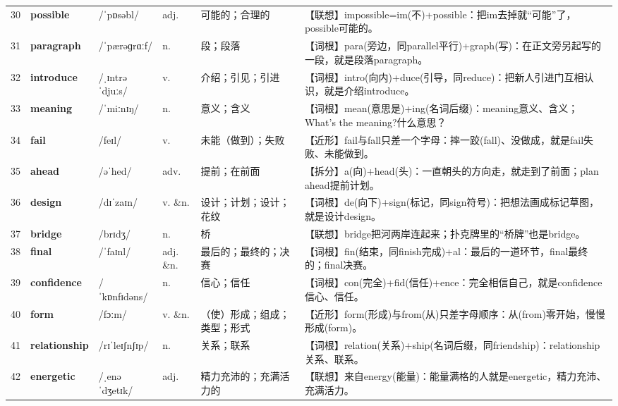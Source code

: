 \documentclass[UTF8,a4paper,11pt,oneside]{ctexbook}
\newcommand{\cellword}[1]{{\bfseries\textcolor{wordcol}{#1}}}
\newcommand{\cellipa}[1]{{\footnotesize\textcolor{ipacol}{#1}}}
\newcommand{\cellpos}[1]{\textcolor{poscol}{#1}}
\newcommand{\cellno}[1]{\textcolor{volcolor!75!black}{#1}}
\begin{document}
{\begin{longtable}{@{}C{0.045\textwidth}L{0.155\textwidth}L{0.175\textwidth}C{0.070\textwidth}L{0.180\textwidth}L{0.282\textwidth}@{}}
\cellno{30} & \cellword{possible} & \cellipa{/ˈpɒsəbl/} & \cellpos{adj.} & 可能的；合理的 & \textcolor{tagAssoc}{【联想】}impossible=im(不)+possible：把im去掉就“可能”了，possible可能的。 \\
 \cellno{31} & \cellword{paragraph} & \cellipa{/ˈpærəɡrɑːf/} & \cellpos{n.} & 段；段落 & \textcolor{tagRoot}{【词根】}para(旁边，同parallel平行)+graph(写)：在正文旁另起写的一段，就是段落paragraph。 \\
\cellno{32} & \cellword{introduce} & \cellipa{/ˌɪntrəˈdjuːs/} & \cellpos{v.} & 介绍；引见；引进 & \textcolor{tagRoot}{【词根】}intro(向内)+duce(引导，同reduce)：把新人引进门互相认识，就是介绍introduce。 \\
 \cellno{33} & \cellword{meaning} & \cellipa{/ˈmiːnɪŋ/} & \cellpos{n.} & 意义；含义 & \textcolor{tagRoot}{【词根】}mean(意思是)+ing(名词后缀)：meaning意义、含义；What's the meaning?什么意思？ \\
\cellno{34} & \cellword{fail} & \cellipa{/feɪl/} & \cellpos{v.} & 未能（做到）；失败 & \textcolor{tagNear}{【近形】}fail与fall只差一个字母：摔一跤(fall)、没做成，就是fail失败、未能做到。 \\
 \cellno{35} & \cellword{ahead} & \cellipa{/əˈhed/} & \cellpos{adv.} & 提前；在前面 & \textcolor{tagSplit}{【拆分】}a(向)+head(头)：一直朝头的方向走，就走到了前面；plan ahead提前计划。 \\
\cellno{36} & \cellword{design} & \cellipa{/dɪˈzaɪn/} & \cellpos{v. \&n.} & 设计；计划；设计；花纹 & \textcolor{tagRoot}{【词根】}de(向下)+sign(标记，同sign符号)：把想法画成标记草图，就是设计design。 \\
 \cellno{37} & \cellword{bridge} & \cellipa{/brɪdʒ/} & \cellpos{n.} & 桥 & \textcolor{tagAssoc}{【联想】}bridge把河两岸连起来；扑克牌里的“桥牌”也是bridge。 \\
\cellno{38} & \cellword{final} & \cellipa{/ˈfaɪnl/} & \cellpos{adj. \&n.} & 最后的；最终的；决赛 & \textcolor{tagRoot}{【词根】}fin(结束，同finish完成)+al：最后的一道环节，final最终的；final决赛。 \\
 \cellno{39} & \cellword{confidence} & \cellipa{/ˈkɒnfɪdəns/} & \cellpos{n.} & 信心；信任 & \textcolor{tagRoot}{【词根】}con(完全)+fid(信任)+ence：完全相信自己，就是confidence信心、信任。 \\
\cellno{40} & \cellword{form} & \cellipa{/fɔːm/} & \cellpos{v. \&n.} & （使）形成；组成；类型；形式 & \textcolor{tagNear}{【近形】}form(形成)与from(从)只差字母顺序：从(from)零开始，慢慢形成(form)。 \\
 \cellno{41} & \cellword{relationship} & \cellipa{/rɪˈleɪʃnʃɪp/} & \cellpos{n.} & 关系；联系 & \textcolor{tagRoot}{【词根】}relation(关系)+ship(名词后缀，同friendship)：relationship关系、联系。 \\
\cellno{42} & \cellword{energetic} & \cellipa{/ˌenəˈdʒetɪk/} & \cellpos{adj.} & 精力充沛的；充满活力的 & \textcolor{tagAssoc}{【联想】}来自energy(能量)：能量满格的人就是energetic，精力充沛、充满活力。 \\
\end{longtable}
}
\end{document}
